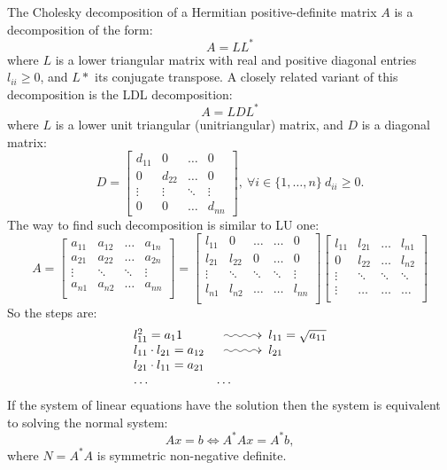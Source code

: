 The Cholesky decomposition of a Hermitian positive-definite matrix $A$ is a decomposition of the form:
\[
    A = LL^*  
\]
where $L$ is a lower triangular matrix with real and positive diagonal entries $l_{ii} \geq 0$, and $L*$ its conjugate transpose. A closely related variant of this decomposition is the LDL decomposition:
\[
    A = LDL^*  
\]
where $L$ is a lower unit triangular (unitriangular) matrix, and $D$ is a diagonal matrix:
\[
    D = \begin{bmatrix}
        d_{11} & 0 & \dots & 0 \\
        0 & d_{22} & \dots & 0 \\
        \vdots & \vdots & \ddots & \vdots \\
        0 & 0 & \dots & d_{nn} 
        \end{bmatrix}  , \ \forall i \in \{1, \ldots, n\} \ d_{ii} \geq 0.
\]
The way to find such decomposition is similar to LU one:
\[
        A = \begin{bmatrix}
            a_{11} & a_{12} & \ldots & a_{1n} \\
            a_{21} & a_{22} & \ldots & a_{2n} \\
            \vdots & \ddots & \ddots & \vdots \\
            a_{n1} & a_{n2} & \ldots & a_{nn} \\
        \end{bmatrix} = \begin{bmatrix}
            l_{11} & 0 & \ldots & \ldots & 0\\
            l_{21} & l_{22} & 0 & \ldots & 0 \\
            \vdots & \ddots & \ddots & \ddots & \vdots\\
            l_{n1} & l_{n2} & \ldots & \ldots & l_{nn} \\
        \end{bmatrix} \begin{bmatrix}
            l_{11} & l_{21} & \ldots & l_{n1}\\
            0 & l_{22} & \ldots & l_{n2} \\
            \vdots & \ddots & \ddots & \ddots\\
            \vdots & \ldots & \ldots & \ldots\\
        \end{bmatrix}
\]
So the steps are:
\[
        \begin{array}{ll}
            l_{11}^2 = a_11 & \xymatrix@C=3em{{}\ar@{~>}[r]&{}} l_{11} = \sqrt{a_{11}}\\
            l_{11} \cdot l_{21} = a_{12} & \xymatrix@C=3em{{}\ar@{~>}[r]&{}} l_{21}\\
            l_{21}\cdot l_{11} = a_{21} & \\
            \ldots & \ldots
        \end{array}
\]
If the system of linear equations have the solution then the system is equivalent to solving the normal system:
\[
        Ax = b \Longleftrightarrow A^*A x = A^* b,
\]
where $N = A^* A$ is symmetric non-negative definite.
